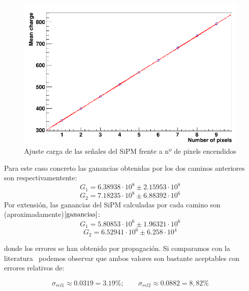 \begin{enumerate}
\begin{enumerate}
	\begin{figure}[hbtp]
		\centering
		\includegraphics[scale=0.4]{FitPosicionPixels.png}
		\caption{Ajuste carga de las señales del SiPM frente a nº de pixels encendidos}
		\end{figure}
			
	\end{enumerate}
	
Para este caso concreto las ganancias obtenidas por los dos caminos anteriores son respectivamentente:
\begin{equation}
G_1= 6.38938 \cdot 10^8 \pm 2.15953 \cdot 10^8
\label{gananciatotalmetodo1} 
\end{equation}
\begin{equation}
G_2=7.18235 \cdot 10^8 \pm 6.88392 \cdot 10^6
\label{gananciatotalmetodo2}
\end{equation}
Por extensión, las ganancias del SiPM calculadas por cada camino son (aproximadamente)$\eqref{ganancias}$: 
\begin{equation}
G_1= 5.80853 \cdot 10^6 \pm 1.96321 \cdot 10^6
\label{gananciaSiPMmetodo1}
\end{equation}
\begin{equation}
G_2= 6.52941 \cdot 10^6 \pm 6.258 \cdot 10^4
\label{gananciaSiPMmetodo2}
\end{equation}

donde los errores se han obtenido por propagación. Si comparamos con la literatura~\cite{datasheet SiPM} podemos observar que ambos valores son bastante aceptables con errores relativos de:

\begin{equation}
\sigma_{rel1} \approx 0.0319 = 3.19\%; \qquad \sigma_{rel2} \approx 0.0882 = 8,82\%
\label{erroresgananciasSiPM}
\end{equation}



\end{enumerate}
